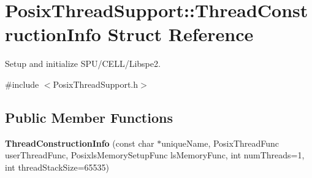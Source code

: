 \hypertarget{struct_posix_thread_support_1_1_thread_construction_info}{\section{Posix\+Thread\+Support\+:\+:Thread\+Construction\+Info Struct Reference}
\label{struct_posix_thread_support_1_1_thread_construction_info}
}


Setup and initialize S\+P\+U/\+C\+E\+L\+L/\+Libspe2.  




{\ttfamily \#include $<$Posix\+Thread\+Support.\+h$>$}

\subsection*{Public Member Functions}
\begin{DoxyCompactItemize}
\item 
\hypertarget{struct_posix_thread_support_1_1_thread_construction_info_a6f493b246c04a3e269899d18123eeea8}{{\bfseries Thread\+Construction\+Info} (const char $\ast$unique\+Name, Posix\+Thread\+Func user\+Thread\+Func, Posixls\+Memory\+Setup\+Func ls\+Memory\+Func, int num\+Threads=1, int thread\+Stack\+Size=65535)}\label{struct_posix_thread_support_1_1_thread_construction_info_a6f493b246c04a3e269899d18123eeea8}

\end{DoxyCompactItemize}
